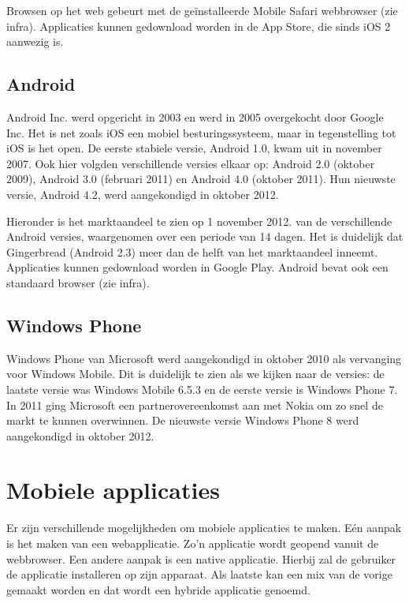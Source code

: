 Browsen op het web gebeurt met de geïnstalleerde Mobile Safari webbrowser (zie infra). Applicaties kunnen gedownload worden in de App Store, die sinds iOS 2 aanwezig is. 

\subsection{Android}
Android Inc. werd opgericht in 2003 en werd in 2005 overgekocht door Google Inc. Het is net zoals iOS een mobiel besturingssysteem, maar in tegenstelling tot iOS is het open. De eerste stabiele versie, Android 1.0, kwam uit in november 2007. Ook hier volgden verschillende versies elkaar op: Android 2.0 (oktober 2009), Android 3.0 (februari 2011) en Android 4.0 (oktober 2011). Hun nieuwste versie, Android 4.2, werd aangekondigd in oktober 2012. 

Hieronder is het marktaandeel te zien op 1 november 2012. van de verschillende Android versies, waargenomen over een periode van 14 dagen. Het is duidelijk dat Gingerbread (Android 2.3) meer dan de helft van het marktaandeel inneemt.
Applicaties kunnen gedownload worden in Google Play. Android bevat ook een standaard browser (zie infra).

\subsection{Windows Phone}
Windows Phone van Microsoft werd aangekondigd in oktober 2010 als vervanging voor Windows Mobile. Dit is duidelijk te zien als we kijken naar de versies: de laatste versie was Windows Mobile 6.5.3 en de eerste versie is Windows Phone 7. In 2011 ging Microsoft een partnerovereenkomst aan met Nokia om zo snel de markt te kunnen overwinnen. De nieuwste versie Windows Phone 8 werd aangekondigd in oktober 2012. 


\section{Mobiele applicaties}
Er zijn verschillende mogelijkheden om mobiele applicaties te maken. Eén aanpak is het maken van een webapplicatie. Zo'n applicatie wordt geopend vanuit de webbrowser. Een andere aanpak is een native applicatie. Hierbij zal de gebruiker de applicatie installeren op zijn apparaat. Als laatste kan een mix van de vorige gemaakt worden en dat wordt een hybride applicatie genoemd.

